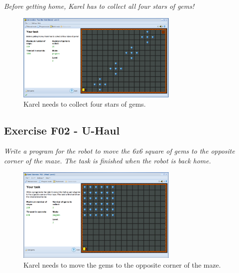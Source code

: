 \documentclass[article,A4,12pt]{llncs}
\begin{document}
{{{{{\em Before getting home, Karel has to collect all four stars of gems!}


\begin{figure}[!ht]
\begin{center}
\includegraphics[width=0.7\textwidth]{img/f01.png}
\end{center}
\vspace{-4mm}
\caption{Karel needs to collect four stars of gems.}
\label{fig:f01}
\vspace{-10mm}
\end{figure}
\noindent

\subsection{Exercise F02 - U-Haul}

{\em Write a program for the robot to move the 6x6 square of gems to the opposite corner of the maze. The task is finished when the robot is back home.}
\newpage

\begin{figure}[!ht]
\begin{center}
\includegraphics[width=0.7\textwidth]{img/f02.png}
\end{center}
\vspace{-4mm}
\caption{Karel needs to move the gems to the opposite corner of the maze.}
\label{fig:f02}
\vspace{-10mm}
\end{figure}
\noindent

}}}}
\end{document}

